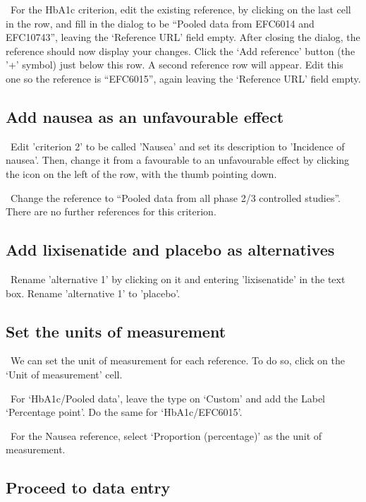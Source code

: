 \documentclass[00_mcda_tutorial.tex]{subfiles}
\begin{document}
\noindent \leftpointright \, For the HbA1c criterion, edit the existing reference, by clicking on the last cell in the row, and fill in the dialog to be  “Pooled data from EFC6014 and EFC10743”, leaving the ‘Reference URL’ field empty. After closing the dialog, the reference should now display your changes. Click  the ‘Add reference’ button (the '+' symbol) just below this row. A second reference row will appear. Edit this one so the reference is “EFC6015”, again leaving the ‘Reference URL’ field empty.

\subsection*{Add nausea as an unfavourable effect}
\noindent \leftpointright \, Edit 'criterion 2' to be called 'Nausea' and set its description to 'Incidence of nausea'. Then, change it from a favourable to an unfavourable effect by clicking the icon on the left of the row, with the thumb pointing down.
\newline

\noindent \leftpointright \, Change the reference to “Pooled data from all phase 2/3 controlled studies”.  There are no further references for this criterion.

\subsection*{Add lixisenatide and placebo as alternatives}
\noindent \leftpointright \, Rename 'alternative 1' by clicking on it and entering 'lixisenatide' in the text box. Rename 'alternative 1' to 'placebo'.

\subsection*{Set the units of measurement}
\noindent \leftpointright \, We can set the unit of measurement for each reference. To do so, click on the ‘Unit of measurement’ cell.
\newline

\noindent \leftpointright \, For ‘HbA1c/Pooled data’, leave the type on ‘Custom’ and add the Label ‘Percentage point’. Do the same for ‘HbA1c/EFC6015’.
\newline

\noindent \leftpointright \, For the Nausea reference, select ‘Proportion (percentage)’ as the unit of measurement.
\newline

\subsection*{Proceed to data entry}
\end{document}
